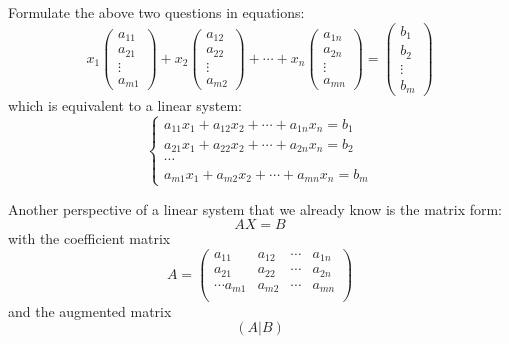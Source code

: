 \documentclass[onecolumn]{ctexart}
\begin{document}
Formulate the above two questions in equations:
\begin{equation}
  x_1 \begin{pmatrix}
    a_{11} \\
    a_{21} \\
    \vdots \\
    a_{m1}
  \end{pmatrix} + 
  x_2 \begin{pmatrix}
    a_{12} \\
    a_{22} \\
    \vdots \\
    a_{m2}   
  \end{pmatrix} + 
  \cdots + 
  x_n \begin{pmatrix}
    a_{1n} \\
    a_{2n} \\
    \vdots \\
    a_{mn}      
  \end{pmatrix} = 
  \begin{pmatrix}
    b_{1} \\
    b_{2} \\
    \vdots \\
    b_{m}         
  \end{pmatrix}
\end{equation}
which is equivalent to a linear system:
\begin{equation}
  \begin{cases}
    a_{11} x_1 + a_{12} x_2 + \cdots + a_{1n} x_n = b_1 \\
    a_{21} x_1 + a_{22} x_2 + \cdots + a_{2n} x_n = b_2 \\
    \cdots \\
    a_{m1} x_1 + a_{m2} x_2 + \cdots + a_{mn} x_n = b_m 
  \end{cases}
\end{equation}

Another perspective of a linear system that we already know is the matrix form:
\begin{equation}
  AX = B
\end{equation}
with the coefficient matrix
\begin{equation}
  A =
  \begin{pmatrix}
    a_{11} & a_{12} & \cdots & a_{1n} \\
    a_{21} & a_{22} & \cdots & a_{2n} \\
    \cdots
    a_{m1} & a_{m2} & \cdots & a_{mn} \\
  \end{pmatrix}
\end{equation}
and the augmented matrix
\begin{equation}
  (A | B)
\end{equation}
\end{document}

